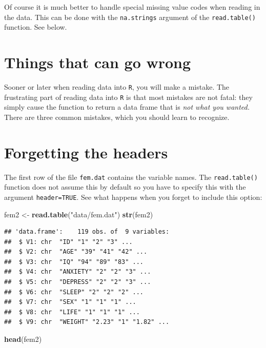 \documentclass[
]{book}
\newenvironment{Shaded}{\begin{snugshade}}{\end{snugshade}}
\newcommand{\FunctionTok}[1]{\textcolor[rgb]{0.13,0.29,0.53}{\textbf{#1}}}
\newcommand{\NormalTok}[1]{#1}
\newcommand{\OtherTok}[1]{\textcolor[rgb]{0.56,0.35,0.01}{#1}}
\newcommand{\StringTok}[1]{\textcolor[rgb]{0.31,0.60,0.02}{#1}}
\begin{document}
Of course it is much better to handle special missing value codes
when reading in the data. This can be done with the
\texttt{na.strings} argument of the \texttt{read.table()}
function. See below.

\section{Things that can go wrong}\label{things-that-can-go-wrong}

Sooner or later when reading data into \texttt{R}, you will make a
mistake. The frustrating part of reading data into \texttt{R} is that
most mistakes are not fatal: they simply cause the function to return
a data frame that is \emph{not what you wanted.} There are three
common mistakes, which you should learn to recognize.

\section{Forgetting the headers}\label{forgetting-the-headers}

The first row of the file \texttt{fem.dat} contains the variable names.
The \texttt{read.table()} function does not assume this by default so
you have to specify this with the argument \texttt{header=TRUE}. See
what happens when you forget to include this option:

\begin{Shaded}
\begin{Highlighting}[]
\NormalTok{fem2 }\OtherTok{\textless{}{-}} \FunctionTok{read.table}\NormalTok{(}\StringTok{"data/fem.dat"}\NormalTok{)}
\FunctionTok{str}\NormalTok{(fem2)}
\end{Highlighting}
\end{Shaded}

\begin{verbatim}
## 'data.frame':    119 obs. of  9 variables:
##  $ V1: chr  "ID" "1" "2" "3" ...
##  $ V2: chr  "AGE" "39" "41" "42" ...
##  $ V3: chr  "IQ" "94" "89" "83" ...
##  $ V4: chr  "ANXIETY" "2" "2" "3" ...
##  $ V5: chr  "DEPRESS" "2" "2" "3" ...
##  $ V6: chr  "SLEEP" "2" "2" "2" ...
##  $ V7: chr  "SEX" "1" "1" "1" ...
##  $ V8: chr  "LIFE" "1" "1" "1" ...
##  $ V9: chr  "WEIGHT" "2.23" "1" "1.82" ...
\end{verbatim}

\begin{Shaded}
\begin{Highlighting}[]
\FunctionTok{head}\NormalTok{(fem2)}
\end{Highlighting}
\end{Shaded}
\end{document}
